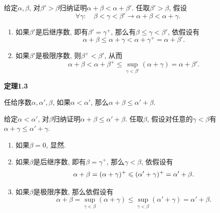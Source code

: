 \documentclass[UTF8]{ctexart}
\begin{document}

给定$\alpha,\beta$, 对$\beta'>\beta$归纳证明$\alpha+\beta<\alpha+\beta'$.
任取$\beta'>\beta$, 假设
\[
    \forall\gamma:\quad\beta<\gamma<\beta'\to\alpha+\beta<\alpha+\gamma.
\]

\begin{enumerate}
    \item 如果$\beta'$是后继序数, 即有$\beta'=\gamma^+$,
    那么有$\beta\leqslant\gamma<\beta'$, 依假设有
    \[
        \alpha+\beta\leqslant\alpha+\gamma<\alpha+\gamma^+=\alpha+\beta'.
    \]
    \item 如果$\beta'$是极限序数, 则$\beta^+<\beta'$, 从而
    \begin{equation*}
        \alpha+\beta<\alpha+\beta^+\leqslant
        \sup_{\gamma<\beta'}(\alpha+\gamma)=\alpha+\beta'.
    \tag*{\qedsymbol}\end{equation*}
\end{enumerate}

\vspace{10pt}

\hypertarget{sec:定理1.3}{}
\noindent\textbf{定理1.3}

任给序数$\alpha,\alpha',\beta$, 如果$\alpha<\alpha'$,
那么$\alpha+\beta\leqslant\alpha'+\beta$.


给定$\alpha<\alpha'$, 对$\beta$归纳证明$\alpha+\beta\leqslant\alpha'+\beta$.
任取$\beta$, 假设对任意的$\gamma<\beta$有$\alpha+\gamma\leqslant\alpha'+\gamma$.

\begin{enumerate}
    \item 如果$\beta=0$, 显然.
    \item 如果$\beta$是后继序数, 即有$\beta=\gamma^+$, 那么$\gamma<\beta$, 依假设有
    \[
        \alpha+\beta=(\alpha+\gamma)^+\leqslant(\alpha'+\gamma)^+=\alpha'+\beta.
        \\[1pt]
    \]
    \item 如果$\beta$是极限序数, 那么依假设有
    \vspace{-1pt}
    \begin{equation*}
        \alpha+\beta=\sup_{\gamma<\beta}(\alpha+\gamma)\leqslant
        \sup_{\gamma<\beta}(\alpha'+\gamma)=\alpha'+\beta.
    \tag*{\qedsymbol}\end{equation*}
\end{enumerate}
\end{document}
